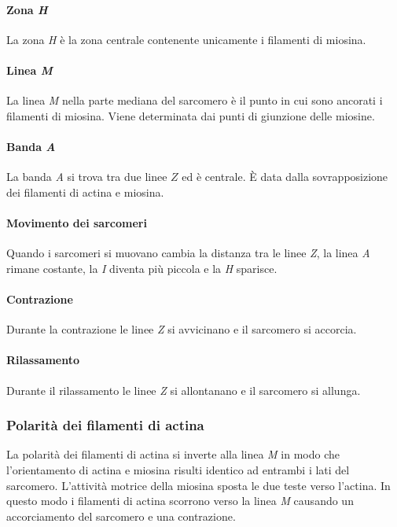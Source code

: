 			\paragraph{Zona \emph{H}}
			La zona \emph{H} \` e la zona centrale contenente unicamente i filamenti di miosina.

			\paragraph{Linea \emph{M}}
			La linea \emph{M} nella parte mediana del sarcomero \`e il punto in cui sono ancorati i filamenti di miosina.
			Viene determinata dai punti di giunzione delle miosine.

			\paragraph{Banda \emph{A}}
			La banda \emph{A} si trova tra due linee $Z$ ed \`e centrale.
			\`E data dalla sovrapposizione dei filamenti di actina e miosina.

			\paragraph{Movimento dei sarcomeri}
			Quando i sarcomeri si muovano cambia la distanza tra le linee \emph{Z}, la linea \emph{A} rimane costante, la \emph{I} diventa pi\`u piccola e la \emph{H} sparisce.

			\paragraph{Contrazione}
			Durante la contrazione le linee \emph{Z} si avvicinano e il sarcomero si accorcia.

			\paragraph{Rilassamento}
			Durante il rilassamento le linee \emph{Z} si allontanano e il sarcomero si allunga.

		\subsubsection{Polarit\`a dei filamenti di actina}
		La polarit\`a dei filamenti di actina si inverte alla linea \emph{M} in modo che l'orientamento di actina e miosina risulti identico ad entrambi i lati del sarcomero.
		L'attivit\`a motrice della miosina sposta le due teste verso l'actina.
		In questo modo i filamenti di actina scorrono verso la linea \emph{M} causando un accorciamento del sarcomero e una contrazione.

